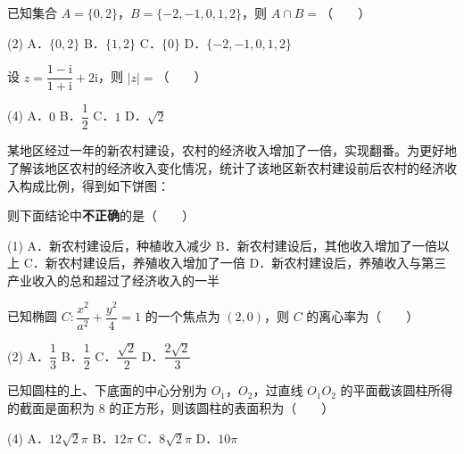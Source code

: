 \begin{question}
已知集合 $A=\{0,2\}$，$B=\{-2,-1,0,1,2\}$，则 $A\cap B=$\mbox{（　　）}

\begin{gkopts}(2)
\task A．$\{0,2\}$
\task B．$\{1,2\}$
\task C．$\{0\}$
\task D．$\{-2,-1,0,1,2\}$
\end{gkopts}

\end{question}
\begin{question}
设 $z=\dfrac{1-\mathrm i}{1+\mathrm i}+2\mathrm i$，则 $|z|=$\mbox{（　　）}

\begin{gkopts}(4)
\task A．$0$
\task B．$\dfrac12$
\task C．$1$
\task D．$\sqrt2$
\end{gkopts}

\Needspace{0.4\textheight}
\end{question}
\begin{question}
某地区经过一年的新农村建设，农村的经济收入增加了一倍，实现翻番。为更好地了解该地区农村的经济收入变化情况，统计了该地区新农村建设前后农村的经济收入构成比例，得到如下饼图：
\nopagebreak[4]
\begin{center}\end{center}
\nopagebreak[4]
则下面结论中\textbf{不正确}的是\mbox{（　　）}

\begin{gkopts}(1)
\task A．新农村建设后，种植收入减少
\task B．新农村建设后，其他收入增加了一倍以上
\task C．新农村建设后，养殖收入增加了一倍
\task D．新农村建设后，养殖收入与第三产业收入的总和超过了经济收入的一半
\end{gkopts}

\par\medskip

\Needspace{0.4\textheight}

\end{question}
\begin{question}
已知椭圆 $C:\dfrac{x^{2}}{a^{2}}+\dfrac{y^{2}}4=1$ 的一个焦点为 $(2,0)$，则 $C$ 的离心率为\mbox{（　　）}

\begin{gkopts}(2)
\task A．$\dfrac13$
\task B．$\dfrac12$
\task C．$\dfrac{\sqrt2}2$
\task D．$\dfrac{2\sqrt2}3$
\end{gkopts}

\end{question}
\begin{question}
已知圆柱的上、下底面的中心分别为 $O_1$，$O_2$，过直线 $O_1O_2$ 的平面截该圆柱所得的截面是面积为 $8$ 的正方形，则该圆柱的表面积为\mbox{（　　）}

\begin{gkopts}(4)
\task A．$12\sqrt2\pi$
\task B．$12\pi$
\task C．$8\sqrt2\pi$
\task D．$10\pi$
\end{gkopts}

\end{question}
